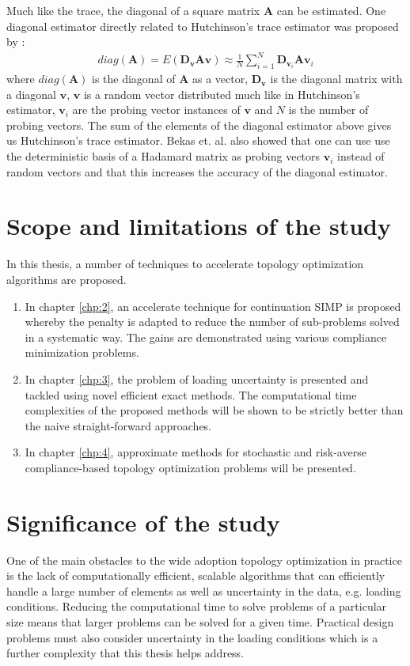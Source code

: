 Much like the trace, the diagonal of a square matrix $\bm{A}$ can be estimated. One diagonal estimator directly related to Hutchinson's trace estimator was proposed by \cite{Bekas2007}:
\begin{align}
  diag(\bm{A}) = E(\bm{D}_{\bm{v}} \bm{A} \bm{v}) \approx \frac{1}{N} \sum_{i=1}^N \bm{D}_{\bm{v}_i} \bm{A} \bm{v}_i
\end{align}
where $diag(\bm{A})$ is the diagonal of $\bm{A}$ as a vector, $\bm{D}_{\bm{v}}$ is the diagonal matrix with a diagonal $\bm{v}$, $\bm{v}$ is a random vector distributed much like in Hutchinson's estimator, $\bm{v}_i$ are the probing vector instances of $\bm{v}$ and $N$ is the number of probing vectors. The sum of the elements of the diagonal estimator above gives us Hutchinson's trace estimator. Bekas et. al. also showed that one can use use the deterministic basis of a Hadamard matrix as probing vectors $\bm{v}_i$ instead of random vectors and that this increases the accuracy of the diagonal estimator.

\newpage
\section{Scope and limitations of the study}

In this thesis, a number of techniques to accelerate topology optimization algorithms are proposed.
\begin{enumerate}
    \item In chapter \ref{chp:2}, an accelerate technique for continuation SIMP is proposed whereby the penalty is adapted to reduce the number of sub-problems solved in a systematic way. The gains are demonstrated using various compliance minimization problems.
    \item In chapter \ref{chp:3}, the problem of loading uncertainty is presented and tackled using novel efficient exact methods. The computational time complexities of the proposed methods will be shown to be strictly better than the naive straight-forward approaches.
    \item In chapter \ref{chp:4}, approximate methods for stochastic and risk-averse compliance-based topology optimization problems will be presented.
\end{enumerate}

\newpage
\section{Significance of the study}

One of the main obstacles to the wide adoption topology optimization in practice is the lack of computationally efficient, scalable algorithms that can efficiently handle a large number of elements as well as uncertainty in the data, e.g. loading conditions. Reducing the computational time to solve problems of a particular size means that larger problems can be solved for a given time. Practical design problems must also consider uncertainty in the loading conditions which is a further complexity that this thesis helps address.

\clearpage
\newpage